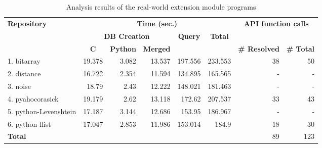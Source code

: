 \begin{table*}[t]
  \vspace{2mm}
  \caption{Analysis results of the real-world extension module programs}
  \label{table:RQ1-4}
  \vspace*{-1em}
  \centering
  \small
\renewcommand{\arraystretch}{.9}
  \begin{tabular}{l||r|r|r|r|r||r|r}
    \multirow{3}{*}{\textbf{Repository}} & \multicolumn{5}{c||}{\textbf{Time (sec.)}} & \multicolumn{2}{c}{\multirow{2}{*}{\textbf{API function calls}}} \\\hhline{~||-----||~~}
    & \multicolumn{3}{c|}{\textbf{DB Creation}} & \multicolumn{1}{c|}{\multirow{2}{*}{\textbf{Query}}} & \multicolumn{1}{c||}{\multirow{2}{*}{\textbf{Total}}} & \multicolumn{2}{c}{}  \\\hhline{~||---~|~||--}
    & \multicolumn{1}{c|}{\textbf{C}} & \multicolumn{1}{c|}{\textbf{Python}} & \multicolumn{1}{c|}{\textbf{Merged}} & \multicolumn{1}{c|}{} & \multicolumn{1}{c||}{} & \multicolumn{1}{c|}{\textbf{\# Resolved}} & \multicolumn{1}{c}{\textbf{\# Total}} \\\hhline{=#*{4}{=|}=#=|=}
  1. bitarray           & 19.378 & 3.082 & 13.537 & 197.556 & 233.553 & 38 & 50 \\
  2. distance           & 16.722 & 2.354 & 11.594 & 134.895 & 165.565 & -  & -  \\
  3. noise              & 18.79  & 2.43  & 12.222 & 148.021 & 181.463 & -  & -  \\
  4. pyahocorasick      & 19.179 & 2.62  & 13.118 & 172.62  & 207.537 & 33 & 43 \\
  5. python-Levenshtein & 17.187 & 3.144 & 12.686 & 153.95  & 186.967 & -  & -  \\
  6. python-llist       & 17.047 & 2.853 & 11.986 & 153.014 & 184.9   & 18 & 30 \\\hhline{=#*{4}{=}=#=|=}
    \textbf{Total}       & \multicolumn{1}{r}{}  & \multicolumn{1}{r}{}     & \multicolumn{1}{r}{}       & \multicolumn{1}{r}{}                       & \multicolumn{1}{r||}{}                    & 89                         & 123                          
  \end{tabular}
\end{table*}
